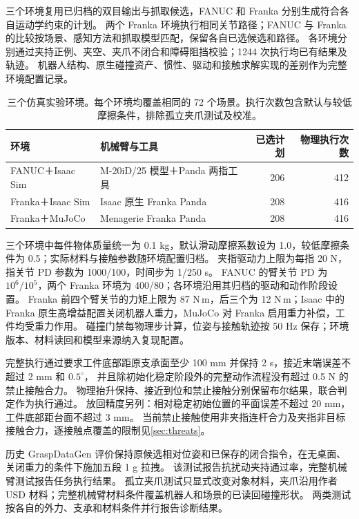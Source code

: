 \documentclass[UTF8,fontset=fandol,a4paper,11pt]{ctexart}
\begin{document}
三个环境复用已归档的双目输出与抓取候选，FANUC 和 Franka 分别生成符合各自运动学约束的计划。
两个 Franka 环境执行相同关节路径；FANUC 与 Franka 的比较按场景、感知方法和抓取模型匹配，保留各自已选候选和路径。
各环境分别通过夹持正例、夹空、夹爪不闭合和障碍阻挡校验；1244 次执行均已有结果及轨迹。
机器人结构、原生碰撞资产、惯性、驱动和接触求解实现的差别作为完整环境配置记录。

\begin{table}[H]
\centering\small
\caption{三个仿真实验环境。每个环境均覆盖相同的 72 个场景。执行次数包含默认与较低摩擦条件，排除孤立夹爪测试及校准。}
\label{tab:environments}
\begin{tabularx}{\linewidth}{Y Y r r}
\toprule
环境 & 机械臂与工具 & 已选计划 & 物理执行次数 \\
\midrule
FANUC＋Isaac Sim & M-20iD/25 模型＋Panda 两指工具 & 206 & 412 \\
Franka＋Isaac Sim & Isaac 原生 Franka Panda & 208 & 416 \\
Franka＋MuJoCo & Menagerie Franka Panda & 208 & 416 \\
\bottomrule
\end{tabularx}
\end{table}

三个环境中每件物体质量统一为 0.1 kg，默认滑动摩擦系数设为 1.0，较低摩擦条件为 0.5；实际材料与接触参数随环境配置归档。
夹指驱动力上限为每指 20 N，指关节 PD 参数为 1000/100，时间步为 1/250 s。
FANUC 的臂关节 PD 为 $10^6/10^5$，两个 Franka 环境为 400/80；各环境沿用其归档的驱动和动作阶段设置。
Franka 前四个臂关节的力矩上限为 87 N\,m，后三个为 12 N\,m；Isaac 中的 Franka 原生高增益配置关闭机器人重力，MuJoCo 对 Franka 启用重力补偿，工件均受重力作用。
碰撞门禁每物理步计算，位姿与接触轨迹按 50 Hz 保存；环境版本、材料读回和模型来源纳入复现配置。

完整执行通过要求工件底部距原支承面至少 100 mm 并保持 2 s，接近末端误差不超过 2 mm 和 $0.5^\circ$，
并且除初始化稳定阶段外的完整动作流程没有超过 0.5 N 的禁止接触合力。
物理抬升保持、接近到位和禁止接触分别保留布尔结果，联合判定作为执行通过。
放回精度另列：相对稳定初始位置的平面误差不超过 20 mm，工件底部距台面不超过 3 mm。
当前禁止接触使用非夹指连杆合力及夹指非目标接触合力，逐接触点覆盖的限制见\cref{sec:threats}。

历史 GraspDataGen 评价保持原候选相对位姿和已保存的闭合指令，在无桌面、关闭重力的条件下施加五段 1 g 拉拽。
该测试报告抗扰动夹持通过率，完整机械臂测试报告任务执行结果。
孤立夹爪测试只显式改变对象材料，夹爪沿用作者 USD 材料；完整机械臂材料条件覆盖机器人和场景的已读回碰撞形状。
两类测试按各自的外力、支承和材料条件并行报告诊断结果。
\end{document}
